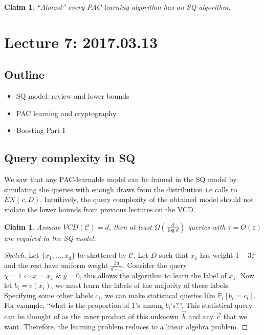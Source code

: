 \documentclass[12pt, letterpaper]{article}
\numberwithin{equation}{section} %
\newcommand{\mb}{\mathbb}
\newcommand{\mc}{\mathcal}
\newcommand{\ve}{\varepsilon}
\newtheorem{claim}[theorem]{Claim}
\theoremstyle{definition}
\theoremstyle{remark}
\begin{document}
\begin{claim}
``Almost'' every PAC-learning algorithm has an SQ-algorithm.
\end{claim}

\section{Lecture 7: 2017.03.13}
\subsection*{Outline}
\begin{itemize}
\item SQ model: review  and lower bounds
\item PAC learning and cryptography
\item Boosting Part I
\end{itemize}

\subsection{Query complexity in SQ}
We saw that any PAC-learnable model can be framed in the SQ model by simulating the queries with enough draws from the distribution i.e calls to $EX(c, D)$. Intuitively,  the query complexity of the obtained model should not violate the lower bounds from previous lectures on the VCD.

\begin{claim}
Assume $VCD(\mc C)=d$, then at least $\Omega\left(\frac d{\log d}\right)$ queries with $\tau = O(\ve)$ are required in the SQ model.
\end{claim}
\begin{proof}[Sketch]
Let $\lbrace x_1,\ldots,x_d\rbrace$ be shattered by $\mc C$. Let $D$ such that $x_1$ has weight $1-3\ve$ and the rest have uniform weight $\frac{3d}{d-1}$. Consider the query $\chi = 1 \iff x=x_1\;\&\; y=0$, this allows the algorithm to learn the label of $x_1$. Now let $b_i = c(x_i)$, we must learn the labels of the majority of these labels. Specifying some other labels $c_i$, we can make statistical queries like $\mb P_i[b_i=c_i]$. For example, ``what is the proportion of 1's among $b_i$'s?''. This statistical query can be thought of as the inner product of this unknown $\vec b$ and any $\vec c$ that we want. Therefore, the learning problem reduces to a linear algebra problem.
\end{proof}
\end{document}
